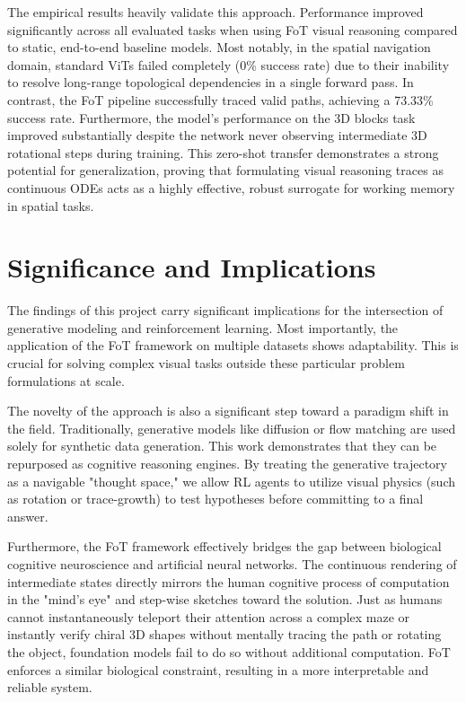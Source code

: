 \documentclass{l4proj}
\begin{document}
The empirical results heavily validate this approach. Performance improved significantly across all evaluated tasks when using FoT visual reasoning compared to static, end-to-end baseline models. Most notably, in the spatial navigation domain, standard ViTs failed completely (0\% success rate) due to their inability to resolve long-range topological dependencies in a single forward pass. In contrast, the FoT pipeline successfully traced valid paths, achieving a 73.33\% success rate. Furthermore, the model's performance on the 3D blocks task improved substantially despite the network never observing intermediate 3D rotational steps during training. This zero-shot transfer demonstrates a strong potential for generalization, proving that formulating visual reasoning traces as continuous ODEs acts as a highly effective, robust surrogate for working memory in spatial tasks.

\section{Significance and Implications}
The findings of this project carry significant implications for the intersection of generative modeling and reinforcement learning. Most importantly, the application of the FoT framework on multiple datasets shows adaptability. This is crucial for solving complex visual tasks outside these particular problem formulations at scale.

The novelty of the approach is also a significant step toward a paradigm shift in the field. Traditionally, generative models like diffusion or flow matching are used solely for synthetic data generation. This work demonstrates that they can be repurposed as cognitive reasoning engines. By treating the generative trajectory as a navigable "thought space," we allow RL agents to utilize visual physics (such as rotation or trace-growth) to test hypotheses before committing to a final answer.

Furthermore, the FoT framework effectively bridges the gap between biological cognitive neuroscience and artificial neural networks. The continuous rendering of intermediate states directly mirrors the human cognitive process of computation in the "mind's eye" and step-wise sketches toward the solution. Just as humans cannot instantaneously teleport their attention across a complex maze or instantly verify chiral 3D shapes without mentally tracing the path or rotating the object, foundation models fail to do so without additional computation. FoT enforces a similar biological constraint, resulting in a more interpretable and reliable system.
\end{document}
